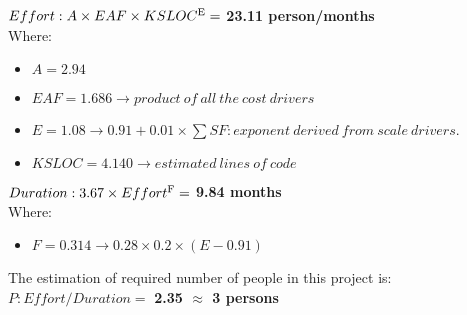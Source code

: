 $ Effort : A \times EAF \times KSLOC\textsuperscript{E} =$ \textbf{23.11 person/months}\\
Where:
\begin{itemize}
	\item $A = 2.94$
	\item $EAF = 1.686 \rightarrow product\ of\ all\ the\ cost\ drivers$
	\item $E = 1.08 \rightarrow 0.91 + 0.01 \times \sum SF : exponent\ derived\ from\ scale\ drivers. $
	\item $KSLOC = 4.140 \rightarrow estimated\ lines\ of\ code $
\end{itemize}
\vspace{10mm}
$ Duration : 3.67 \times Effort\textsuperscript{F} =$ \textbf{9.84 months}\\
Where:
\begin{itemize}
	\item $F = 0.314 \rightarrow 0.28 \times 0.2 \times (E - 0.91)$ 
\end{itemize}
\vspace{10mm}
The estimation of required number of people in this project is:\\
$P : Effort/Duration =$ \textbf{2.35 $\approx$ 3 persons} 
